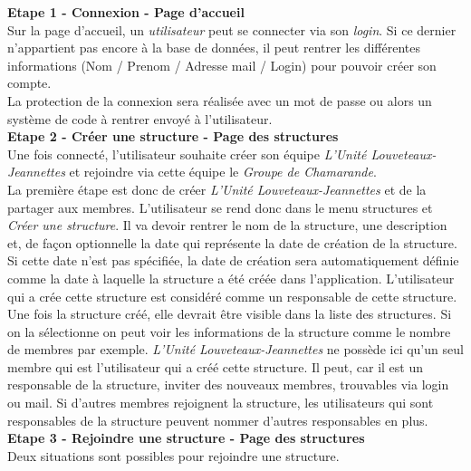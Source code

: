\newline
\textbf{Etape 1 - Connexion - Page d'accueil}\\
Sur la page d'accueil, un \textit{utilisateur} peut se connecter via son \textit{login}. Si ce dernier n'appartient pas encore à la base de données, il peut rentrer les différentes informations (Nom / Prenom / Adresse mail / Login) pour pouvoir créer son compte. \\
\newline 
La protection de la connexion sera réalisée avec un mot de passe ou alors un système de code à rentrer envoyé à l'utilisateur. \\
\newline
\textbf{Etape 2 - Créer une structure - Page des structures}\\
Une fois connecté, l'utilisateur souhaite créer son équipe \textit{L’Unité Louveteaux-Jeannettes} et rejoindre via cette équipe le \textit{Groupe de Chamarande}.\\
\newline
La première étape est donc de créer \textit{L’Unité Louveteaux-Jeannettes} et de la partager aux membres. L'utilisateur se rend donc dans le menu structures et \textit{Créer une structure}. Il va devoir rentrer le nom de la structure, une description et, de façon optionnelle la date qui représente la date de création de la structure. Si cette date n'est pas spécifiée, la date de création sera automatiquement définie comme la date à laquelle la structure a été créée dans l'application. L'utilisateur qui a crée cette structure est considéré comme un responsable de cette structure.\\
\newline
Une fois la structure créé, elle devrait être visible dans la liste des structures. Si on la sélectionne on peut voir les informations de la structure comme le nombre de membres par exemple. \textit{L’Unité Louveteaux-Jeannettes} ne possède ici qu'un seul membre qui est l'utilisateur qui a créé cette structure. Il peut, car il est un responsable de la structure, inviter des nouveaux membres, trouvables via login ou mail. Si d'autres membres rejoignent la structure, les utilisateurs qui sont responsables de la structure peuvent nommer d'autres responsables en plus.\\
\newline
\textbf{Etape 3 - Rejoindre une structure - Page des structures}\\
Deux situations sont possibles pour rejoindre une structure. 
